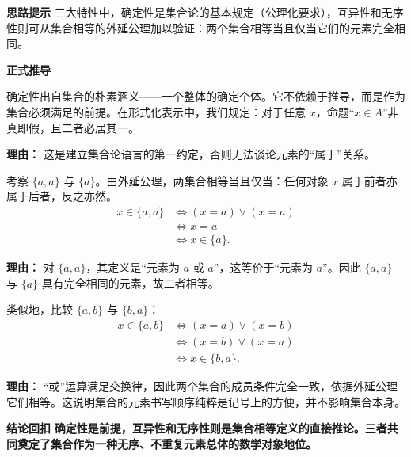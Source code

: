 \begin{proofbox}
	\textbf{\textcolor{CProof}{思路提示}}
	三大特性中，确定性是集合论的基本规定（公理化要求），互异性和无序性则可从集合相等的外延公理加以验证：两个集合相等当且仅当它们的元素完全相同。

	\medskip
	\textbf{\textcolor{CProof}{正式推导}}
	\begin{description}[style=nextline, leftmargin=2.8em, labelsep=0.5em, itemsep=0.55em]
		\item[\textbf{步骤一（确定性确认）：}]
			确定性出自集合的朴素涵义——一个整体的确定个体。它不依赖于推导，而是作为集合必须满足的前提。在形式化表示中，我们规定：对于任意 $x$，命题“$x\in A$”非真即假，且二者必居其一。
			\par\textbf{理由：} 这是建立集合论语言的第一约定，否则无法谈论元素的“属于”关系。
		\item[\textbf{步骤二（互异性验证）：}]
			考察 $\{a,a\}$ 与 $\{a\}$。由外延公理，两集合相等当且仅当：任何对象 $x$ 属于前者亦属于后者，反之亦然。
			\[
				\begin{aligned}
					x\in\{a,a\} &\iff (x=a)\vee (x=a) \\&\iff x=a \\&\iff x\in\{a\}.
			\end{aligned}
			\]
			\par\textbf{理由：} 对 $\{a,a\}$，其定义是“元素为 $a$ 或 $a$”，这等价于“元素为 $a$”。因此 $\{a,a\}$ 与 $\{a\}$ 具有完全相同的元素，故二者相等。
		\item[\textbf{步骤三（无序性验证）：}]
			类似地，比较 $\{a,b\}$ 与 $\{b,a\}$：
			\[
				\begin{aligned}
					x\in\{a,b\} &\iff (x=a)\vee (x=b) \\&\iff (x=b)\vee (x=a) \\&\iff x\in\{b,a\}.
			\end{aligned}
			\]
			\par\textbf{理由：} “或”运算满足交换律，因此两个集合的成员条件完全一致，依据外延公理它们相等。这说明集合的元素书写顺序纯粹是记号上的方便，并不影响集合本身。
	\end{description}

	\medskip
	\textbf{\textcolor{CProof}{结论回扣}}
	\textbf{确定性是前提，互异性和无序性则是集合相等定义的直接推论。三者共同奠定了集合作为一种无序、不重复元素总体的数学对象地位。}
\end{proofbox}
